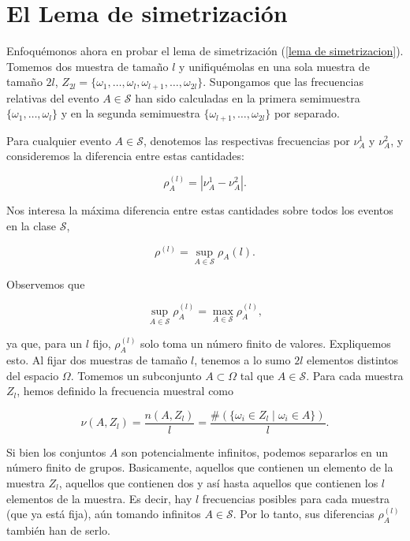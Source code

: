 \documentclass{report}
\begin{document}
\bigskip

\section{El Lema de simetrización}

Enfoquémonos ahora en probar el lema de simetrización (\ref{lema de simetrizacion}). Tomemos dos muestra de tamaño $l$ y
unifiquémolas en una sola muestra de tamaño \( 2l \),
\( Z_{2l} = \{ \omega_1, \dots, \omega_l, \omega_{l+1}, \dots, \omega_{2l} \} \). Supongamos que las frecuencias relativas del evento \( A \in \mathcal{S} \) 
han sido calculadas en la primera semimuestra \( \{ \omega_1, \dots, \omega_l \} \) y en la segunda semimuestra \( \{ \omega_{l+1}, \dots, \omega_{2l} \} \)
por separado.\newline

Para cualquier evento $A\in\mathcal{S}$, denotemos las respectivas frecuencias por \( \nu_A^{1}\) y \( \nu_A^{2} \), 
y consideremos la diferencia entre estas cantidades:

\[
\rho^{(l)}_A = |\nu_A^{1} - \nu_A^{2}|.
\]

Nos interesa la máxima diferencia entre estas cantidades sobre todos los eventos en la clase \( \mathcal{S} \),

\[
\rho^{(l)} = \sup_{A \in \mathcal{S}} \rho_A(l).
\]

Observemos que 

\[
\sup_{A \in \mathcal{S}} \rho_A^{(l)} = \max_{A \in \mathcal{S}} \rho_A^{(l)},
\]

ya que, para un \( l \) fijo, \( \rho_A^{(l)} \) solo toma un número finito de valores. Expliquemos esto.
Al fijar dos muestras de tamaño $l$, tenemos a lo sumo $2l$ elementos distintos del espacio $\Omega$. Tomemos un
subconjunto $A\subset \Omega$ tal que $A\in\mathcal{S}$. Para cada muestra $Z_l$, hemos definido la frecuencia muestral
como 

\[
\nu(A,Z_l) = \frac{n(A,Z_l)}{l} = \frac{\#(\{ \omega_i \in Z_l \mid \omega_i \in A \})}{l}.
\]

Si bien los conjuntos $A$ son potencialmente infinitos, podemos separarlos en un número finito de grupos. Basicamente,
aquellos que contienen un elemento de la muestra $Z_l$, aquellos que contienen dos y así hasta aquellos que contienen
los $l$ elementos de la muestra. Es decir, hay $l$ frecuencias posibles para cada muestra (que ya está fija), aún
tomando infinitos $A\in\mathcal{S}$. Por lo tanto, sus diferencias $\rho_A^{(l)}$ también han de serlo.\newline
\end{document}
